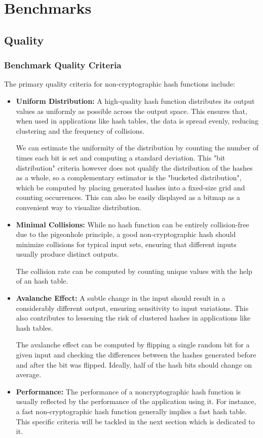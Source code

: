 \documentclass[10pt]{article}
\begin{document}
\clearpage
\section{Benchmarks}

\subsection{Quality}

\subsubsection{Benchmark Quality Criteria}
The primary quality criteria for non-cryptographic hash functions include:

\begin{itemize}
    \item \textbf{Uniform Distribution:} A high-quality hash function distributes its output values as uniformly as possible across the output space. This ensures that, when used in applications like hash tables, the data is spread evenly, reducing clustering and the frequency of collisions.

    We can estimate the uniformity of the distribution by counting the number of times each bit is set and computing a standard deviation. This "bit distribution" criteria however does not qualify the distribution of the hashes as a whole, so a complementary estimator is the "bucketed distribution", which be computed by placing generated hashes into a fixed-size grid and counting occurrences. This can also be easily displayed as a bitmap as a convenient way to visualize distribution.
    \item \textbf{Minimal Collisions:} While no hash function can be entirely collision-free due to the pigeonhole principle, a good non-cryptographic hash should minimize collisions for typical input sets, ensuring that different inputs usually produce distinct outputs.
    
    The collision rate can be computed by counting unique values with the help of an hash table.
    \item \textbf{Avalanche Effect:} A subtle change in the input should result in a considerably different output, ensuring sensitivity to input variations. This also contributes to lessening the risk of clustered hashes in applications like hash tables.
    
    The avalanche effect can be computed by flipping a single random bit for a given input and checking the differences between the hashes generated before and after the bit was flipped. Ideally, half of the hash bits should change on average.
    \item \textbf{Performance:} The performance of a noncryptographic hash function is usually reflected by the performance of the application using it. For instance, a fast non-cryptographic hash function generally implies a fast hash table. This specific criteria will be tackled in the next section which is dedicated to it. 

\end{itemize}
\end{document}
